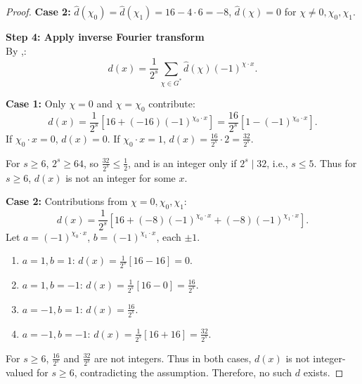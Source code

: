 \documentclass[12pt,twoside,]{amsart}
\theoremstyle{plain}
\theoremstyle{definition}
\begin{document}
\begin{proof}
\textbf{Case 2:}  
\( \widehat{d}(\chi_0) = \widehat{d}(\chi_1) = 16 - 4 \cdot 6 = -8 \),  
\( \widehat{d}(\chi) = 0 \) for \( \chi \neq 0, \chi_0, \chi_1 \).

\medskip

\noindent \textbf{Step 4: Apply inverse Fourier transform} \\
By ,:
\[
d(x) = \frac{1}{2^s} \sum_{\chi \in G^*} \widehat{d}(\chi) (-1)^{\chi \cdot x}.
\]

\textbf{Case 1:}  
Only \( \chi = 0 \) and \( \chi = \chi_0 \) contribute:
\[
d(x) = \frac{1}{2^s} \left[ 16 + (-16)(-1)^{\chi_0 \cdot x} \right] = \frac{16}{2^s} \left[ 1 - (-1)^{\chi_0 \cdot x} \right].
\]
If \( \chi_0 \cdot x = 0 \), \( d(x) = 0 \).  
If \( \chi_0 \cdot x = 1 \), \( d(x) = \frac{16}{2^s} \cdot 2 = \frac{32}{2^s} \).

For \( s \ge 6 \), \( 2^s \ge 64 \), so \( \frac{32}{2^s} \le \frac{1}{2} \), and is an integer only if \( 2^s \mid 32 \), i.e., \( s \le 5 \).  
Thus for \( s \ge 6 \), \( d(x) \) is not an integer for some \( x \). 


\textbf{Case 2:}  
Contributions from \( \chi = 0, \chi_0, \chi_1 \):
\[
d(x) = \frac{1}{2^s} \left[ 16 + (-8)(-1)^{\chi_0 \cdot x} + (-8)(-1)^{\chi_1 \cdot x} \right].
\]
Let \( a = (-1)^{\chi_0 \cdot x} \), \( b = (-1)^{\chi_1 \cdot x} \), each \( \pm 1 \).

\begin{enumerate}
    \item \( a = 1, b = 1 \): \( d(x) = \frac{1}{2^s}[16 - 16] = 0 \).
    \item \( a = 1, b = -1 \): \( d(x) = \frac{1}{2^s}[16 - 0] = \frac{16}{2^s} \).
    \item \( a = -1, b = 1 \): \( d(x) = \frac{16}{2^s} \).
    \item \( a = -1, b = -1 \): \( d(x) = \frac{1}{2^s}[16 + 16] = \frac{32}{2^s} \).
\end{enumerate}
For \( s \ge 6 \), \( \frac{16}{2^s} \) and \( \frac{32}{2^s} \) are not integers.
\medskip
Thus in both cases, \( d(x) \) is not integer-valued for \( s \ge 6 \), contradicting the assumption.  
Therefore, no such \( d \) exists.

\end{proof}
\end{document}

